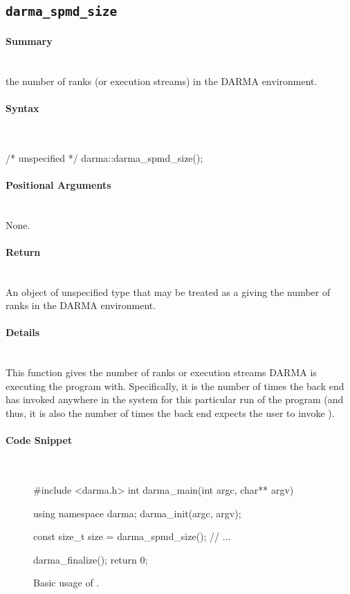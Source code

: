 \subsection{\texttt{darma\_spmd\_size}}


\paragraph{Summary}\mbox{}\\
 the number of \glspl{rank} (or \glspl{execution
stream}) in the \gls{DARMA} environment.

\paragraph{Syntax}\mbox{}\\
\begin{CppCode}
/* unspecified */ darma::darma_spmd_size();
\end{CppCode}

\paragraph{Positional Arguments} \mbox{}\\
None. 

\paragraph{Return} \mbox{}\\
An object of unspecified type that may be treated as a 
giving the number of \glspl{rank} in the \gls{DARMA} environment.

\paragraph{Details} \mbox{}\\
This function gives the number of \glspl{rank} or \glspl{execution stream}
\gls{DARMA} is executing the program with. 
Specifically, it is the number of times the 
back end has invoked
 anywhere in the system for this particular run of the
program (and thus, it is also the number of times the
back end expects the user
to invoke ).

\paragraph{Code Snippet} \mbox{}\\
\begin{figure}[!h]
\begin{CppCodeNumb}
#include <darma.h>
int darma_main(int argc, char** argv)
{
  using namespace darma;
  darma_init(argc, argv);

  const size_t size = darma_spmd_size();
  // ...

  darma_finalize();
  return 0;
}
\end{CppCodeNumb}
\label{fig:fe_api_ranksize}
  \caption{Basic usage of \protect{}.}
\end{figure}

